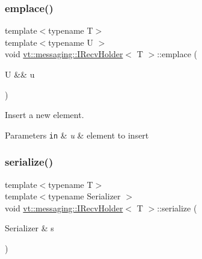 \subsubsection{\texorpdfstring{emplace()}{emplace()}}
{\footnotesize\ttfamily template$<$typename T$>$ \\
template$<$typename U $>$ \\
void \hyperlink{structvt_1_1messaging_1_1_i_recv_holder}{vt\+::messaging\+::\+I\+Recv\+Holder}$<$ T $>$\+::emplace (\begin{DoxyParamCaption}\item[{U \&\&}]{u }\end{DoxyParamCaption})\hspace{0.3cm}{\ttfamily [inline]}}



Insert a new element. 


\begin{DoxyParams}[1]{Parameters}
\mbox{\tt in}  & {\em u} & element to insert \\
\hline
\end{DoxyParams}
\mbox{\label{structvt_1_1messaging_1_1_i_recv_holder_a10cebd825dd5ff043368d0dfd3bc9064}} 
\subsubsection{\texorpdfstring{serialize()}{serialize()}}
{\footnotesize\ttfamily template$<$typename T$>$ \\
template$<$typename Serializer $>$ \\
void \hyperlink{structvt_1_1messaging_1_1_i_recv_holder}{vt\+::messaging\+::\+I\+Recv\+Holder}$<$ T $>$\+::serialize (\begin{DoxyParamCaption}\item[{Serializer \&}]{s }\end{DoxyParamCaption})\hspace{0.3cm}{\ttfamily [inline]}}

\mbox{\label{structvt_1_1messaging_1_1_i_recv_holder_ac1314360b79a5deb3a79b970158e83aa}} 
